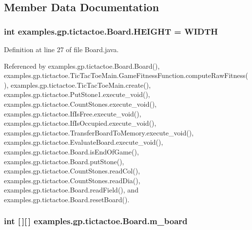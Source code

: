 \subsection{Member Data Documentation}
\hypertarget{classexamples_1_1gp_1_1tictactoe_1_1_board_aa0183ffc1692e094a69283aeb7903003}{
\subsubsection[{H\-E\-I\-G\-H\-T}]{\setlength{\rightskip}{0pt plus 5cm}int examples.\-gp.\-tictactoe.\-Board.\-H\-E\-I\-G\-H\-T = {\bf W\-I\-D\-T\-H}\hspace{0.3cm}{\ttfamily [static]}}}\label{classexamples_1_1gp_1_1tictactoe_1_1_board_aa0183ffc1692e094a69283aeb7903003}


Definition at line 27 of file Board.\-java.



Referenced by examples.\-gp.\-tictactoe.\-Board.\-Board(), examples.\-gp.\-tictactoe.\-Tic\-Tac\-Toe\-Main.\-Game\-Fitness\-Function.\-compute\-Raw\-Fitness(), examples.\-gp.\-tictactoe.\-Tic\-Tac\-Toe\-Main.\-create(), examples.\-gp.\-tictactoe.\-Put\-Stone1.\-execute\-\_\-void(), examples.\-gp.\-tictactoe.\-Count\-Stones.\-execute\-\_\-void(), examples.\-gp.\-tictactoe.\-If\-Is\-Free.\-execute\-\_\-void(), examples.\-gp.\-tictactoe.\-If\-Is\-Occupied.\-execute\-\_\-void(), examples.\-gp.\-tictactoe.\-Transfer\-Board\-To\-Memory.\-execute\-\_\-void(), examples.\-gp.\-tictactoe.\-Evaluate\-Board.\-execute\-\_\-void(), examples.\-gp.\-tictactoe.\-Board.\-is\-End\-Of\-Game(), examples.\-gp.\-tictactoe.\-Board.\-put\-Stone(), examples.\-gp.\-tictactoe.\-Count\-Stones.\-read\-Col(), examples.\-gp.\-tictactoe.\-Count\-Stones.\-read\-Dia(), examples.\-gp.\-tictactoe.\-Board.\-read\-Field(), and examples.\-gp.\-tictactoe.\-Board.\-reset\-Board().

\hypertarget{classexamples_1_1gp_1_1tictactoe_1_1_board_ac9a85f9960650c1049d9939f66c89457}{
\subsubsection[{m\-\_\-board}]{\setlength{\rightskip}{0pt plus 5cm}int \mbox{[}$\,$\mbox{]}\mbox{[}$\,$\mbox{]} examples.\-gp.\-tictactoe.\-Board.\-m\-\_\-board\hspace{0.3cm}{\ttfamily [private]}}}\label{classexamples_1_1gp_1_1tictactoe_1_1_board_ac9a85f9960650c1049d9939f66c89457}



